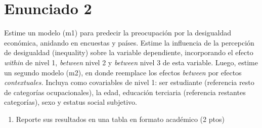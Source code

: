 \documentclass[
  12pt,
  a4paper,
]{article}
\providecommand{\tightlist}{%
  \setlength{\itemsep}{0pt}\setlength{\parskip}{0pt}}
\begin{document}
\hypertarget{enunciado-2}{%
\section{Enunciado 2}\label{enunciado-2}}

Estime un modelo (m1) para predecir la preocupación por la desigualdad económica, anidando en encuestas y países. Estime la influencia de la percepción de desigualdad (inequality) sobre la variable dependiente, incorporando el efecto \emph{within} de nivel 1, \emph{between} nivel 2 y \emph{between} nivel 3 de esta variable. Luego, estime un segundo modelo (m2), en donde reemplace los efectos \emph{between} por efectos \emph{contextuales.} Incluya como covariables de nivel 1: ser estudiante (referencia resto de categorías ocupacionales), la edad, educación terciaria (referencia restantes categorías), sexo y estatus social subjetivo.

\begin{enumerate}
\def\labelenumi{\alph{enumi})}
\tightlist
\item
  Reporte sus resultados en una tabla en formato académico (2 ptos)
\end{enumerate}
\end{document}
